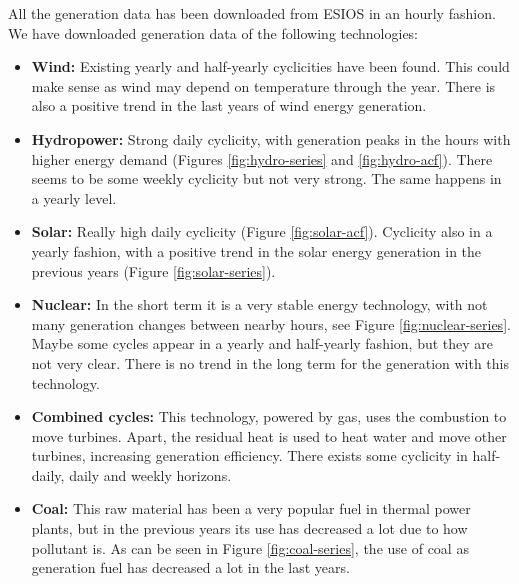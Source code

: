 All the generation data has been downloaded from ESIOS in an hourly fashion.
We have downloaded generation data of the following technologies:
\begin{itemize}
    \item \textbf{Wind:} Existing yearly and half-yearly cyclicities have been found. This could make sense as wind may depend on temperature through the year. There is also a positive trend in the last years of wind energy generation.
    \item \textbf{Hydropower:} Strong daily cyclicity, with generation peaks in the hours with higher energy demand (Figures \ref{fig:hydro-series} and \ref{fig:hydro-acf}). There seems to be some weekly cyclicity but not very strong. The same happens in a yearly level.
    \item \textbf{Solar:} Really high daily cyclicity (Figure \ref{fig:solar-acf}). Cyclicity also in a yearly fashion, with a positive trend in the solar energy generation in the previous years (Figure \ref{fig:solar-series}).
    \item \textbf{Nuclear:} In the short term it is a very stable energy technology, with not many generation changes between nearby hours, see Figure \ref{fig:nuclear-series}. Maybe some cycles appear in a yearly and half-yearly fashion, but they are not very clear. There is no trend in the long term for the generation with this technology.
    \item \textbf{Combined cycles:} This technology, powered by gas, uses the combustion to move turbines. Apart, the residual heat is used to heat water and move other turbines, increasing generation efficiency. There exists some cyclicity in half-daily, daily and weekly horizons.
    \item \textbf{Coal:} This raw material has been a very popular fuel in thermal power plants, but in the previous years its use has decreased a lot due to how pollutant is. As can be seen in Figure \ref{fig:coal-series}, the use of coal as generation fuel has decreased a lot in the last years.
\end{itemize}

